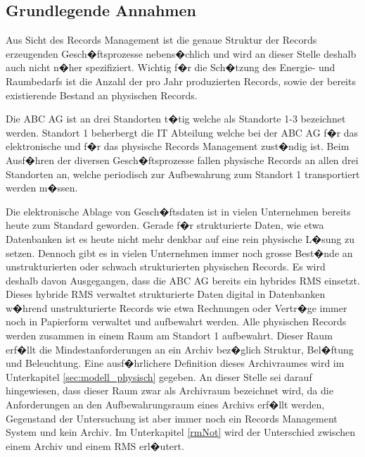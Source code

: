 \documentclass[a4paper,twoside,10pt]{report}
\begin{document}
\subsection{Grundlegende Annahmen}
\label{subsec:grundannahmen}
Aus Sicht des Records Management ist die genaue Struktur der Records erzeugenden Gesch�ftsprozesse nebens�chlich und wird an dieser Stelle deshalb auch nicht n�her spezifiziert. Wichtig f�r die Sch�tzung des Energie- und Raumbedarfs ist die Anzahl der pro Jahr produzierten Records, sowie der bereits existierende Bestand an physischen Records. 

Die ABC AG ist an drei Standorten t�tig welche als Standorte 1-3 bezeichnet werden. Standort 1 beherbergt die IT Abteilung welche bei der ABC AG f�r das elektronische und f�r das physische Records Management zust�ndig ist. Beim Ausf�hren der diversen Gesch�ftsprozesse fallen physische Records an allen drei Standorten an, welche periodisch zur Aufbewahrung zum Standort 1 transportiert werden m�ssen. 

Die elektronische Ablage von Gesch�ftsdaten ist in vielen Unternehmen bereits heute zum Standard geworden. Gerade f�r strukturierte Daten, wie etwa Datenbanken ist es heute nicht mehr denkbar auf eine rein physische L�sung zu setzen. Dennoch gibt es in vielen Unternehmen immer noch grosse Best�nde an unstrukturierten oder schwach strukturierten physischen Records. Es wird deshalb davon Ausgegangen, dass die ABC AG bereits ein hybrides \ac{RMS} einsetzt. Dieses hybride \ac{RMS} verwaltet strukturierte Daten digital in Datenbanken w�hrend unstrukturierte Records wie etwa Rechnungen oder Vertr�ge immer noch in Papierform verwaltet und aufbewahrt werden. Alle physischen Records werden zusammen in einem Raum am Standort 1 aufbewahrt. Dieser Raum erf�llt die Mindestanforderungen an ein Archiv bez�glich Struktur, Bel�ftung und Beleuchtung. Eine ausf�hrlichere Definition dieses Archivraumes wird im Unterkapitel \ref{sec:modell_physisch} gegeben. An dieser Stelle sei darauf hingewiesen, dass dieser Raum zwar als Archivraum bezeichnet wird, da die Anforderungen an den Aufbewahrungsraum eines Archivs erf�llt werden, Gegenstand der Untersuchung ist aber immer noch ein Records Management System und kein Archiv. Im Unterkapitel \ref{rmNot} wird der Unterschied zwischen einem Archiv und einem \ac{RMS} erl�utert. 
\end{document}
